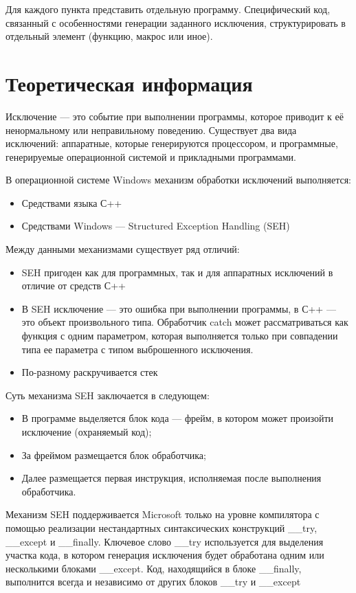     Для каждого пункта представить отдельную программу.
    Специфический код, связанный с особенностями генерации заданного исключения, структурировать в отдельный элемент (функцию, макрос или иное).

    \section{Теоретическая информация}
    Исключение — это событие при выполнении программы, которое приводит к её ненормальному или неправильному поведению.
    Существует два вида исключений: аппаратные, которые генерируются процессором, и программные, генерируемые операционной системой и прикладными программами.

    В операционной системе Windows механизм обработки исключений выполняется:
    \begin{itemize}
        \item Средствами языка С++
        \item Средствами Windows — Structured Exception Handling (SEH)
    \end{itemize}
    Между данными механизмами существует ряд отличий:
    \begin{itemize}
        \item SEH пригоден как для программных, так и для аппаратных исключений в отличие от средств С++
        \item В SEH исключение — это ошибка при выполнении программы, в С++ — это объект произвольного типа. Обработчик catch может рассматриваться как функция с одним параметром, которая выполняется только при совпадении типа ее параметра с типом выброшенного исключения.
        \item По-разному раскручивается стек
    \end{itemize}
    Суть механизма SEH заключается в следующем:
    \begin{itemize}
        \item В программе выделяется блок кода — фрейм, в котором может произойти исключение (охраняемый код);
        \item За фреймом размещается блок обработчика;
        \item Далее размещается первая инструкция, исполняемая после выполнения обработчика.
    \end{itemize}
    Механизм SEH поддерживается Microsoft только на уровне компилятора с помощью реализации нестандартных синтаксических конструкций \_\_try, \_\_except и \_\_finally.
    Ключевое слово \_\_try используется для выделения участка кода, в котором генерация исключения будет обработана одним или несколькими блоками \_\_except.
    Код, находящийся в блоке \_\_finally, выполнится всегда и независимо от других блоков \_\_try и \_\_except

